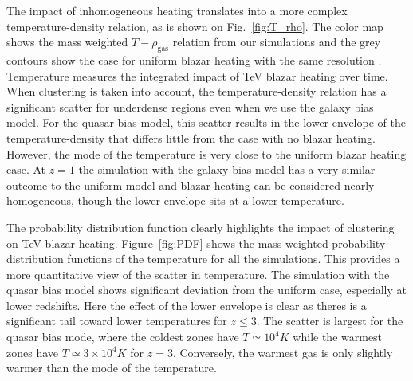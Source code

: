 \documentclass[numberedappendix]{emulateapj}
\begin{document}
{The impact of inhomogeneous heating translates into a more complex temperature-density relation, as is shown on Fig.~\ref{fig:T_rho}. The color map shows the mass weighted $T-\rho_{\mathrm{gas}}$ relation from our simulations and the grey contours show the case for uniform blazar heating with the same resolution \citep{2012MNRAS.423..149P}. Temperature measures the integrated impact of TeV blazar heating over time. When clustering is taken into account, the temperature-density relation has a significant scatter for underdense regions even when we use the galaxy bias model. For the quasar bias model, this scatter results in the lower envelope of the temperature-density that differs little from the case with no blazar heating. However, the mode of the temperature is very close to the uniform blazar heating case. At $z=1$ the simulation with the galaxy bias model has a very similar outcome to the uniform model and blazar heating can be considered nearly homogeneous, though the lower envelope sits at a lower temperature.

The probability distribution function clearly highlights the impact of clustering on TeV blazar heating. Figure~\ref{fig:PDF} shows the mass-weighted probability distribution functions of the temperature for all the simulations. This provides a more quantitative view of the scatter in temperature. The simulation with the quasar bias model shows significant deviation from the uniform case, especially at lower redshifts. Here the effect of the lower envelope is clear as theres is a significant tail toward lower temperatures for $z \leqslant 3$. The scatter is largest for the quasar bias mode, where the coldest zones have $T\simeq 10^4K$ while the warmest zones have $T\simeq 3\times 10^4K$ for $z=3$. Conversely, the warmest gas is only slightly warmer than the mode of the temperature. 

}
\end{document}
